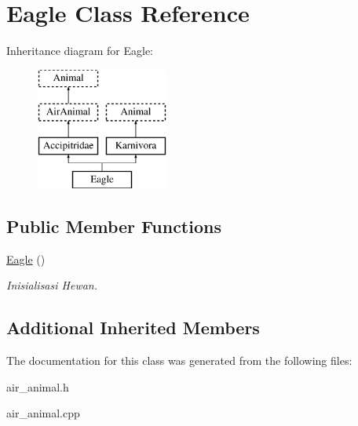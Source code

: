 \hypertarget{class_eagle}{}\section{Eagle Class Reference}
\label{class_eagle}
Inheritance diagram for Eagle\+:\begin{figure}[H]
\begin{center}
\leavevmode
\includegraphics[height=4.000000cm]{class_eagle}
\end{center}
\end{figure}
\subsection*{Public Member Functions}
\begin{DoxyCompactItemize}
\item 
\hyperlink{class_eagle_a8b205e5b26bece07d18b852b042851fe}{Eagle} ()\hypertarget{class_eagle_a8b205e5b26bece07d18b852b042851fe}{}\label{class_eagle_a8b205e5b26bece07d18b852b042851fe}

\begin{DoxyCompactList}\small\item\em Inisialisasi Hewan. \end{DoxyCompactList}\end{DoxyCompactItemize}
\subsection*{Additional Inherited Members}


The documentation for this class was generated from the following files\+:\begin{DoxyCompactItemize}
\item 
air\+\_\+animal.\+h\item 
air\+\_\+animal.\+cpp\end{DoxyCompactItemize}
